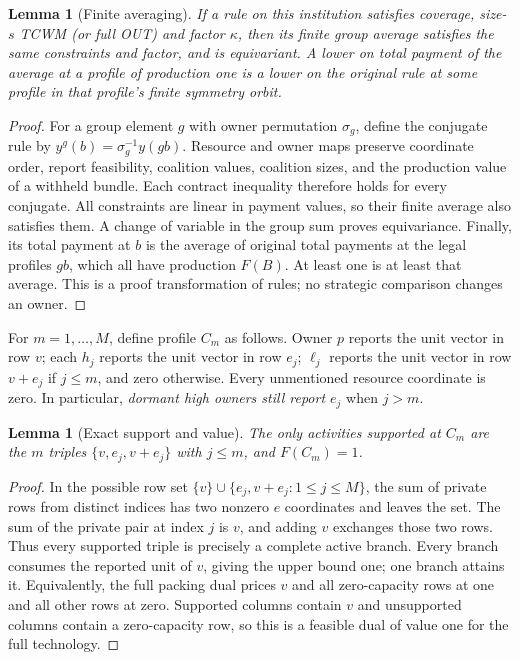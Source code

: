 \documentclass[11pt]{article}
\newtheorem{lemma}[theorem]{Lemma}
\theoremstyle{definition}\newtheorem{definition}[theorem]{Definition}
\theoremstyle{remark}\newtheorem{remark}[theorem]{Remark}
\begin{document}
\begin{lemma}[Finite averaging]\label{lem:average}
If a rule on this institution satisfies coverage, size-$s$ TCWM (or full OUT)
and factor $\kappa$, then its finite group average satisfies the same
constraints and factor, and is equivariant. A lower on total payment of the
average at a profile of production one is a lower on the original rule at
some profile in that profile's finite symmetry orbit.
\end{lemma}
\begin{proof}
For a group element $g$ with owner permutation $\sigma_g$, define the
conjugate rule by $y^g(b)=\sigma_g^{-1}y(gb)$. Resource and owner maps preserve
coordinate order, report feasibility, coalition values, coalition sizes,
and the production value of a withheld bundle. Each contract inequality
therefore holds for every conjugate. All constraints are linear in payment
values, so their finite average also satisfies them. A change of variable
in the group sum proves equivariance. Finally, its total payment at $b$ is
the average of original total payments at the legal profiles $gb$, which
all have production $F(B)$. At least one is at least that average. This is a
proof transformation of rules; no strategic comparison changes an owner.
\end{proof}

For $m=1,\ldots,M$, define profile $C_m$ as follows. Owner $p$ reports the
unit vector in row $v$; each $h_j$ reports the unit vector in row $e_j$;
$\ell_j$ reports the unit vector in row $v+e_j$ if $j\le m$, and zero
otherwise. Every unmentioned resource coordinate is zero. In particular,
\emph{dormant high owners still report $e_j$} when $j>m$.

\begin{lemma}[Exact support and value]\label{lem:star-support}
The only activities supported at $C_m$ are the $m$ triples
$\{v,e_j,v+e_j\}$ with $j\le m$, and $F(C_m)=1$.
\end{lemma}
\begin{proof}
In the possible row set
$\{v\}\cup\{e_j,v+e_j:1\le j\le M\}$, the sum of private rows from
 distinct indices has two nonzero $e$ coordinates and leaves the set. The
sum of the private pair at index $j$ is $v$, and adding $v$ exchanges those
two rows. Thus every supported triple is precisely a complete active branch.
Every branch consumes the reported unit of $v$, giving the upper bound one;
one branch attains it. Equivalently, the full packing dual prices $v$ and
all zero-capacity rows at one and all other rows at zero. Supported columns
contain $v$ and unsupported columns contain a zero-capacity row, so this is
a feasible dual of value one for the full technology.
\end{proof}
\end{document}

